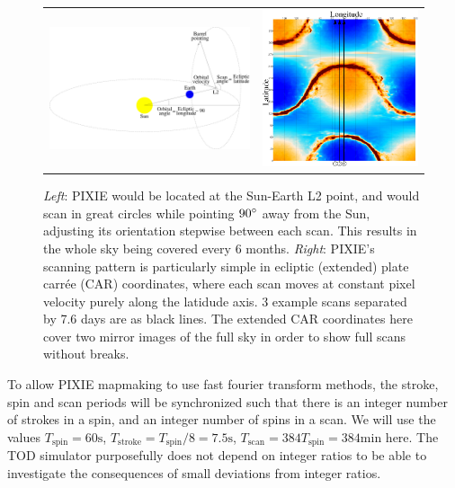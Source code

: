 \documentclass{article}
\begin{document}
\begin{figure}
	\centering
	\begin{tabular}{m{90mm}m{70mm}}
		\includegraphics[width=90mm]{plots/scan_orbit.pdf} &
		\includegraphics[width=70mm]{plots/scan_car.pdf}
	\end{tabular}
	\caption{\emph{Left}: PIXIE would be located at the Sun-Earth L2 point,
	and would scan in great circles while pointing $90\degree$ away from the
	Sun, adjusting its orientation stepwise between each scan. This results
	in the whole sky being covered every 6 months. \emph{Right}: PIXIE's
	scanning pattern is particularly simple in ecliptic (extended) plate carrée (CAR)
	coordinates, where each scan moves at constant pixel velocity purely along the
	latidude axis. 3 example scans separated by 7.6 days are as black lines.
	The extended CAR coordinates here cover two mirror images of the full sky
	in order to show full scans without breaks.}
\end{figure}

To allow PIXIE mapmaking to use fast fourier transform methods, the stroke, spin
and scan periods will be synchronized such that there is an integer number of
strokes in a spin, and an integer number of spins in a scan. We will use the
values $T_\textrm{spin} = 60 \textrm{s}$, $T_\textrm{stroke} = T_\textrm{spin}/8 =
7.5 \textrm{s}$, $T_\textrm{scan} = 384 T_\textrm{spin} = 384 \textrm{min}$ here.
The TOD simulator purposefully does not depend on integer ratios to be able
to investigate the consequences of small deviations from integer ratios.
\end{document}
